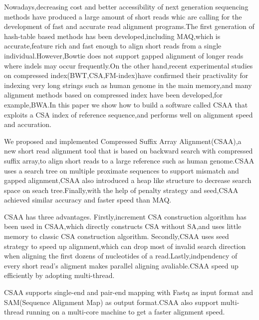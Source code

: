 \begin{englishabstract}

\setlength\parindent{0em}

\vspace{2ex}
Nowadays,decreasing cost and better accessibility of next generation sequencing methods
have produced a large amount of short reads whic are calling for the development of fast
and accurate read alignment programs.The first generation of hash-table based methods has
been developed,including MAQ,which is accurate,feature rich and fast enough to align short
reads from a single individual.However,Bowtie does not support gapped alignment of longer reads
where indels may occur frequently.On the other hand,recent experimental studies on compressed
index(BWT,CSA,FM-index)have confirmed their practivality for indexing very long strings such
as human genome in the main memory,and many alignment methods based on compressed index have
been developed,for example,BWA.In this paper we show how to build a software called CSAA that
exploits a CSA index of reference sequence,and performs well on alignment speed and accuration.

\vspace{2ex}
We proposed and implemented Compressed Suffix Array Alignment(CSAA),a new short read alignment
tool that is based on backward search with compressed suffix array,to align short reads to a
large reference such as human genome.CSAA uses a search tree on multiple proximate sequences to
support mismatch and gapped alignment,CSAA also introduced a heap like structure to decrease
search space on seach tree.Finally,with the help of penalty strategy and seed,CSAA achieved
similar accuracy and faster speed than MAQ.


\vspace{2ex}
CSAA has three advantages. Firstly,increment CSA construction algorithm has been used in
CSAA,which directly constructs CSA without SA,and uses little memory to classic CSA construction algorithm.
Secondly,CSAA uses seed strategy to speed up alignment,which can drop most of invalid
search direction when aligning the first dozens of nucleotides of a read.Lastly,indpendency of
every short read's aligment makes parallel aligning avaliable.CSAA speed up efficiently by
adopting multi-thread.

\vspace{2ex}
CSAA supports single-end and pair-end mapping with Fastq as input format and SAM(Sequence Alignment Map)
as output format.CSAA also support multi-thread running on a multi-core machine to get a faster
alignment speed.



\end{englishabstract}


